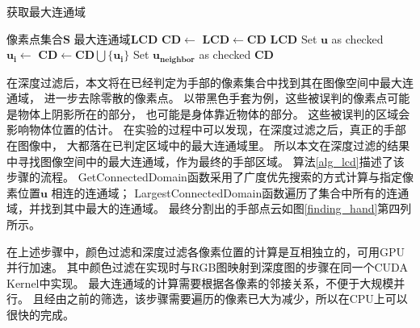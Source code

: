 \begin{algorithm}
    \fangsong
    \caption{获取最大连通域}
    \label{alg_lcd}
    \begin{algorithmic}[1]
        \Require 像素点集合$\mathbf{S}$
        \Ensure 最大连通域$\mathbf{LCD}$
                    \State $\mathbf{CD} \gets$ 
                        \State $\mathbf{LCD} \gets  \mathbf{CD}$
                    \EndIf
                \EndIf
            \EndFor
            \State \Return $\mathbf{LCD}$
        \EndFunction
            \State {}
            \State Set $\mathbf{u}$ as checked
                \State $\mathbf{u_i} \gets$ 
                \State $\mathbf{CD} \gets \mathbf{CD} \bigcup \{\mathbf{u_i}\}$
                        \State {}
                        \State Set $\mathbf{u_{neighbor}}$ as checked
                    \EndIf
                \EndFor
            \EndWhile
            \State \Return $\mathbf{CD}$
        \EndFunction
    \end{algorithmic}
\end{algorithm}
在深度过滤后，本文将在已经判定为手部的像素集合中找到其在图像空间中最大连通域，
进一步去除零散的像素点。
以带黑色手套为例，这些被误判的像素点可能是物体上阴影所在的部分，
也可能是身体靠近物体的部分。
这些被误判的区域会影响物体位置的估计。
在实验的过程中可以发现，在深度过滤之后，真正的手部在图像中，
大都落在已判定区域中的最大连通域里。
所以本文在深度过滤的结果中寻找图像空间中的最大连通域，作为最终的手部区域。
算法\ref{alg_lcd}描述了该步骤的流程。
GetConnectedDomain函数采用了广度优先搜索的方式计算与指定像素位置$\mathbf{u}$
相连的连通域；
LargestConnectedDomain函数遍历了集合中所有的连通域，并找到其中最大的连通域。
最终分割出的手部点云如图\ref{finding_hand}第四列所示。

在上述步骤中，颜色过滤和深度过滤各像素位置的计算是互相独立的，可用GPU并行加速。
其中颜色过滤在实现时与RGB图映射到深度图的步骤在同一个CUDA Kernel中实现。
最大连通域的计算需要根据各像素的邻接关系，不便于大规模并行。
且经由之前的筛选，该步骤需要遍历的像素已大为减少，所以在CPU上可以很快的完成。


